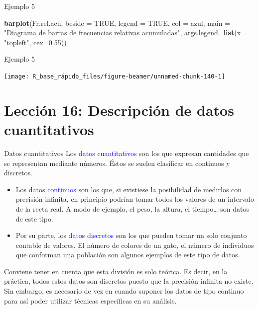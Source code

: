 \documentclass[
  ignorenonframetext,
  aspectratio=169]{beamer}
\newenvironment{Shaded}{\begin{snugshade}}{\end{snugshade}}
\newcommand{\AttributeTok}[1]{\textcolor[rgb]{0.13,0.29,0.53}{#1}}
\newcommand{\ConstantTok}[1]{\textcolor[rgb]{0.56,0.35,0.01}{#1}}
\newcommand{\FloatTok}[1]{\textcolor[rgb]{0.00,0.00,0.81}{#1}}
\newcommand{\FunctionTok}[1]{\textcolor[rgb]{0.13,0.29,0.53}{\textbf{#1}}}
\newcommand{\NormalTok}[1]{#1}
\newcommand{\StringTok}[1]{\textcolor[rgb]{0.31,0.60,0.02}{#1}}
\newcommand\blue[1]{\textcolor{blue}{#1}}
\begin{document}
\begin{frame}[fragile]{Ejemplo 5}
\label{ejemplo-5-9}
\begin{Shaded}
\begin{Highlighting}[]
\FunctionTok{barplot}\NormalTok{(Fr.rel.acu, }\AttributeTok{beside =} \ConstantTok{TRUE}\NormalTok{, }\AttributeTok{legend =} \ConstantTok{TRUE}\NormalTok{, }\AttributeTok{col =}\NormalTok{ azul, }
        \AttributeTok{main =} \StringTok{"Diagrama de barras de frecuencias relativas acumuladas"}\NormalTok{, }
        \AttributeTok{args.legend=}\FunctionTok{list}\NormalTok{(}\AttributeTok{x =} \StringTok{"topleft"}\NormalTok{, }\AttributeTok{cex=}\FloatTok{0.55}\NormalTok{))}
\end{Highlighting}
\end{Shaded}
\end{frame}

\begin{frame}{Ejemplo 5}
\label{ejemplo-5-10}
\begin{center}\texttt{[image: R\_base\_rápido\_files/figure-beamer/unnamed-chunk-140-1]} \end{center}
\end{frame}

\section{Lección 16: Descripción de datos
cuantitativos}\label{lecciuxf3n-16-descripciuxf3n-de-datos-cuantitativos}

\begin{frame}{Datos cuantitativos}
\label{datos-cuantitativos}
Los \blue{datos cuantitativos} son los que expresan cantidades que se
representan mediante números. Éstos se suelen clasificar en continuos y
discretos.

\begin{itemize}
\item
  Los \blue{datos continuos} son los que, si existiese la posibilidad de
  medirlos con precisión infinita, en principio podrían tomar todos los
  valores de un intervalo de la recta real. A modo de ejemplo, el peso,
  la altura, el tiempo\ldots{} son datos de este tipo.
\item
  Por su parte, los \blue{datos discretos} son los que pueden tomar un
  solo conjunto contable de valores. El número de colores de un gato, el
  número de individuos que conforman una población son algunos ejemplos
  de este tipo de datos.
\end{itemize}

Conviene tener en cuenta que esta división es solo teórica. Es decir, en
la práctica, todos estos datos son discretos puesto que la precisión
infinita no existe. Sin embargo, es necesario de vez en cuando suponer
los datos de tipo continuo para así poder utilizar técnicas específicas
en su análisis.
\end{frame}
\end{document}

